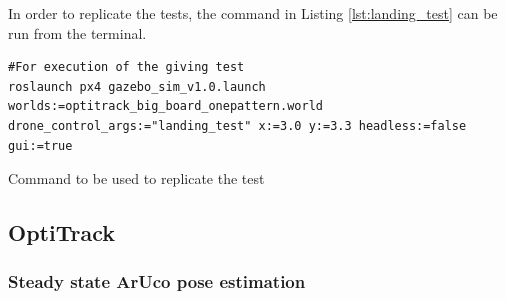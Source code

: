 \documentclass[../Head/report.tex]{subfiles}
\begin{document}
In order to replicate the tests, the command in Listing \ref{lst:landing_test} can be run from the terminal.

\begin{listing}[H] 
\begin{tcolorbox}[
    enhanced,
    attach boxed title to top left={xshift=6mm,yshift=-3mm},
    colback=lightgreen!20,
    colframe=lightgreen,
    fonttitle=\bfseries\color{black},
]
\begin{verbatim}
#For execution of the giving test
roslaunch px4 gazebo_sim_v1.0.launch worlds:=optitrack_big_board_onepattern.world drone_control_args:="landing_test" x:=3.0 y:=3.3 headless:=false gui:=true
\end{verbatim}
\end{tcolorbox}
\caption{Command to be used to replicate the test}
\label{lst:landing_test}    
\end{listing} 

\subsection{OptiTrack}
\label{sec:optitrack}

\subsubsection{Steady state ArUco pose estimation}
\label{sec:steady_state_aruco_pose_estimation}
\end{document}
